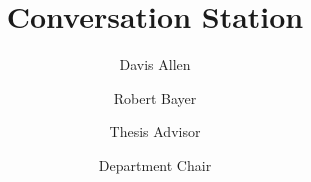 \documentclass{scu-thesis}
\author{Davis Allen}
\author{Robert Bayer}
\title{Conversation Station}
\begin{document}
\frontmatter
\signature{Thesis Advisor}
\signature{Department Chair}

\maketitle


\tableofcontents
\listoffigures

\mainmatter















\backmatter
\end{document}
